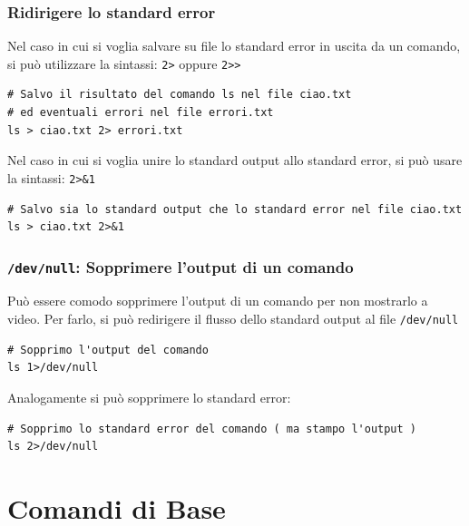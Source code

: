 \documentclass[a4paper]{report}
\newenvironment{info}{\begin{tcolorbox}[fonttitle=\sffamily\bfseries\large,title=Info,colframe=blue!75!white]}{\end{tcolorbox}}
\newenvironment{code}{\begin{tcolorbox}[size=small]}{\end{tcolorbox}}
\begin{document}
\subsection{Ridirigere lo standard error}

Nel caso in cui si voglia salvare su file lo standard error in uscita da un comando, si può utilizzare la sintassi: \texttt{2>} oppure \texttt{2>>}
\begin{code}
\begin{lstlisting}
# Salvo il risultato del comando ls nel file ciao.txt
# ed eventuali errori nel file errori.txt
ls > ciao.txt 2> errori.txt
\end{lstlisting}
\end{code}

\begin{info}
	Nel caso in cui si voglia unire lo standard output allo standard error, si può usare la sintassi: \texttt{2>\&1}
	\begin{lstlisting}
# Salvo sia lo standard output che lo standard error nel file ciao.txt
ls > ciao.txt 2>&1
	\end{lstlisting}
\end{info}

\subsection{\texttt{/dev/null}: Sopprimere l'output di un comando}

Può essere comodo sopprimere l'output di un comando per non mostrarlo a video. Per farlo, si può redirigere il flusso dello standard output al file \texttt{/dev/null}
\begin{code}
\begin{lstlisting}
# Sopprimo l'output del comando
ls 1>/dev/null
\end{lstlisting}
\end{code}

\begin{info}
	Analogamente si può sopprimere lo standard error:
	\begin{lstlisting}
# Sopprimo lo standard error del comando ( ma stampo l'output )
ls 2>/dev/null
	\end{lstlisting}
\end{info}


\chapter{Comandi di Base}
\end{document}
